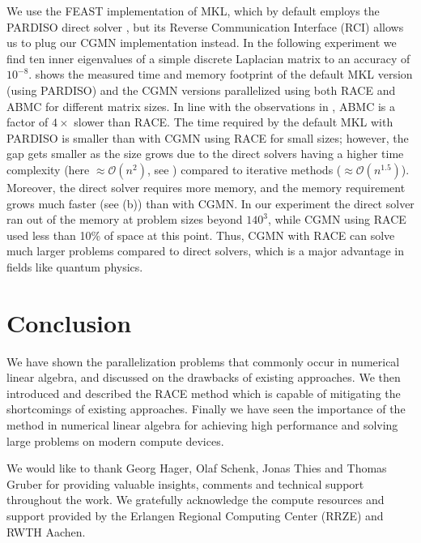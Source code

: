 We use the FEAST implementation of \acrshort{MKL}, which by default employs
the PARDISO direct solver \cite{Pardiso}, but  its Reverse Communication Interface (RCI) allows us  to plug our CGMN implementation instead. In the following experiment we find ten inner eigenvalues of a simple discrete Laplacian matrix to an accuracy of $10^{-8}$.
 shows the measured time and memory footprint of
the default MKL version (using PARDISO) and the CGMN versions
 parallelized using both \acrshort{RACE} and \acrshort{ABMC}
for different matrix sizes. In line
with the observations in , \acrshort{ABMC}
is a factor of $4\times$ slower than \acrshort{RACE}.
The time required by the default MKL with PARDISO is smaller than with CGMN using \acrshort{RACE} for small sizes; however, the gap gets smaller as the 
size grows due to the direct solvers having a higher time complexity
(here $\approx \mathcal{O}(n^{2})$, see ) compared to
iterative methods ($\approx \mathcal{O}(n^{1.5})$).
Moreover, the direct solver requires more memory, and the memory
requirement grows much faster (see (b)) than
with CGMN. 
In our experiment the direct solver ran out of the memory at problem sizes
beyond $140^3$, while CGMN using \acrshort{RACE} used less than 10\%
of space at this point. Thus, CGMN with \acrshort{RACE} can solve much larger 
problems compared to direct solvers, which is a major advantage 
in fields like quantum physics.

\section*{Conclusion}
We have shown the parallelization problems that commonly occur in numerical 
linear algebra, and discussed on the drawbacks of existing approaches.
We  then introduced and described the \acrshort{RACE} method  which 
is capable of mitigating the shortcomings of existing approaches.
Finally we have seen the importance of the method in numerical 
linear algebra for achieving high performance and solving large 
problems on modern compute devices.



\begin{acks}
We would like to thank Georg Hager, Olaf Schenk, Jonas Thies and Thomas Gruber
 for providing valuable insights, comments and technical support throughout the 
 work.  We gratefully acknowledge the compute resources and support provided by
 the Erlangen Regional Computing Center (RRZE) and RWTH Aachen.
\end{acks}


